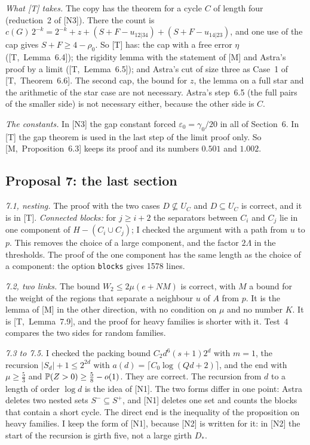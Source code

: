 \documentclass[11pt]{article}
\newcommand{\M}[1]{[M,~#1]}
\newcommand{\T}[1]{[T,~#1]}
\begin{document}
\emph{What [T] takes.} The copy has the theorem for a cycle $C$ of length four (reduction~2 of
[N3]). There the count is
$c(G)\,2^{-k}=2^{-k}+z+(S+F-u_{12|34})+(S+F-u_{14|23})$, and one use of the cap gives
$S+F\ge4-\rho_0$. So [T] has: the cap with a free error $\eta$ (\T{Lemma~6.4}); the rigidity
lemma with the statement of [M] and Astra's proof by a limit (\T{Lemma~6.5}); and Astra's cut
of size three as Case~1 of \T{Theorem~6.6}. The second cap, the bound for $z$, the lemma on a
full star and the arithmetic of the star case are not necessary. Astra's step~6.5 (the full
pairs of the smaller side) is not necessary either, because the other side is $C$.

\emph{The constants.} In [N3] the gap constant forced $\varepsilon_0=\gamma_0/20$ in all of
Section~6. In [T] the gap theorem is used in the last step of the limit proof only. So
\M{Proposition~6.3} keeps its proof and its numbers $0.501$ and $1.002$.

\subsection{Proposal 7: the last section}

\emph{7.1, nesting.} The proof with the two cases $D\not\subseteq U_C$ and $D\subseteq U_C$ is
correct, and it is in [T]. \emph{Connected blocks:} for $j\ge i+2$ the separators between $C_i$
and $C_j$ lie in one component of $H-(C_i\cup C_j)$; I checked the argument with a path from $u$
to $p$. This removes the choice of a large component, and the factor $2\Lambda$ in the
thresholds. The proof of the one component has the same length as the choice of a component:
the option \texttt{blocks} gives 1578 lines.

\emph{7.2, two links.} The bound $W_2\le2\mu(e+NM)$ is correct, with $M$ a bound for the weight
of the regions that separate a neighbour $u$ of $A$ from $p$. It is the lemma of [M] in the
other direction, with no condition on $\mu$ and no number $K$. It is \T{Lemma~7.9}, and the
proof for heavy families is shorter with it. Test~4 compares the two sides for random families.

\emph{7.3 to 7.5.} I checked the packing bound $C_2d^{6}(s+1)2^{d}$ with $m=1$, the recursion
$|S_d|+1\le2^{2d}$ with $a(d)=\lceil C_0\log(Qd+2)\rceil$, and the end with $\mu\ge\frac53$ and
$\mathbb{P}(Z>0)\ge\frac58-o(1)$. They are correct. The recursion from $d$ to a length of order
$\log d$ is the idea of [N1]. The two forms differ in one point: Astra deletes two nested sets
$S^{-}\subseteq S^{+}$, and [N1] deletes one set and counts the blocks that contain a short
cycle. The direct end is the inequality of the proposition on heavy families. I keep the form
of [N1], because [N2] is written for it: in [N2] the start of the recursion is girth five, not
a large girth $D_*$.
\end{document}
